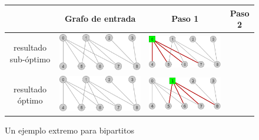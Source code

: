 	\begin{figure}[H]
	\caption{Un ejemplo extremo para bipartitos}
	\label{fig:extremo_bipartito}
	\begin{center}
		\begin{tabular}{|c||c||c||c|}
		\hline
		& Grafo de entrada & Paso 1 & Paso 2 \\ 
			\hline
			resultado sub-\'optimo &
			\includegraphics[scale = 0.2]{img/ej3/constructiva_golosa/k5,4Nocompleto_st0.png} &
			\includegraphics[scale = 0.2]{img/ej3/constructiva_golosa/k5,4Nocompleto_st01.png} & \\
			\hline
			resultado \'optimo &
			\includegraphics[scale = 0.2]{img/ej3/constructiva_golosa/k5,4Nocompleto_st0.png} &
			\includegraphics[scale = 0.2]{img/ej3/constructiva_golosa/k5,4Nocompleto_st11.png} & 

\end{tabular}
\end{center}
\end{figure}
